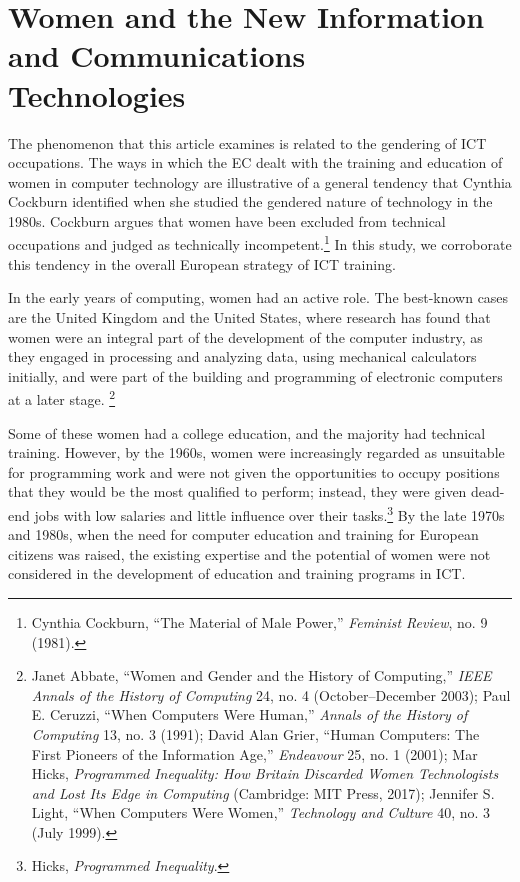 \documentclass{tufte-handout}
\begin{document}
\hypertarget{women-and-the-new-information-and-communications-technologies}{%
\section{Women and the New Information and Communications\\\noindent
Technologies}\label{women-and-the-new-information-and-communications-technologies}}

The phenomenon that this article examines is related to the gendering of
ICT occupations. The ways in which the EC dealt with the training and
education of women in computer technology are illustrative of a general
tendency that Cynthia Cockburn identified when she studied the gendered
nature of technology in the 1980s. Cockburn argues that women have been
excluded from technical occupations and judged as technically
incompetent.\footnote{Cynthia Cockburn, ``The Material of Male Power,''
  \emph{Feminist Review}, no. 9 (1981).} In this study, we corroborate
this tendency in the overall European strategy of ICT training.

In the early years of computing, women had an active role. The
best-known cases are the United Kingdom and the United States, where
research has found that women were an integral part of the development
of the computer industry, as they engaged in processing and analyzing
data, using mechanical calculators initially, and were part of the
building and programming of electronic computers at a later stage.
\footnote{Janet Abbate, ``Women and Gender and the History of
  Computing,'' \emph{IEEE Annals of the History of Computing} 24, no. 4
  (October--December 2003); Paul E. Ceruzzi, ``When Computers Were
  Human,'' \emph{Annals of the History of Computing} 13, no. 3 (1991);
  David Alan Grier, ``Human Computers: The First Pioneers of the
  Information Age,'' \emph{Endeavour} 25, no. 1 (2001); Mar Hicks,
  \emph{Programmed Inequality: How Britain} \emph{Discarded Women
  Technologists and Lost Its Edge in Computing} (Cambridge: MIT Press,
  2017); Jennifer S. Light, ``When Computers Were Women,''
  \emph{Technology and Culture} 40, no. 3 (July 1999).}

Some of these women had a college education, and the majority had
technical training. However, by the 1960s, women were increasingly
regarded as unsuitable for programming work and were not given the
opportunities to occupy positions that they would be the most qualified
to perform; instead, they were given dead-end jobs with low salaries and
little influence over their tasks.\footnote{Hicks, \emph{Programmed
  Inequality}.} By the late 1970s and 1980s, when the need for computer
education and training for European citizens was raised, the existing
expertise and the potential of women were not considered in the
development of education and training programs in ICT.
\end{document}
